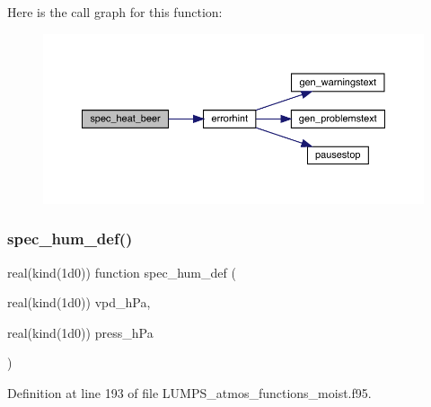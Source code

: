 Here is the call graph for this function\+:\nopagebreak
\begin{figure}[H]
\begin{center}
\leavevmode
\includegraphics[width=350pt]{_l_u_m_p_s__atmos__functions__moist_8f95_ad67fce32939b8349b7af6a3aa30d2d5b_cgraph}
\end{center}
\end{figure}
\mbox{\label{_l_u_m_p_s__atmos__functions__moist_8f95_a23dfe0352f06dab2858ae44f81b54a89}} 
\subsubsection{\texorpdfstring{spec\+\_\+hum\+\_\+def()}{spec\_hum\_def()}}
{\footnotesize\ttfamily real(kind(1d0)) function spec\+\_\+hum\+\_\+def (\begin{DoxyParamCaption}\item[{real(kind(1d0))}]{vpd\+\_\+h\+Pa,  }\item[{real(kind(1d0))}]{press\+\_\+h\+Pa }\end{DoxyParamCaption})}



Definition at line 193 of file L\+U\+M\+P\+S\+\_\+atmos\+\_\+functions\+\_\+moist.\+f95.

